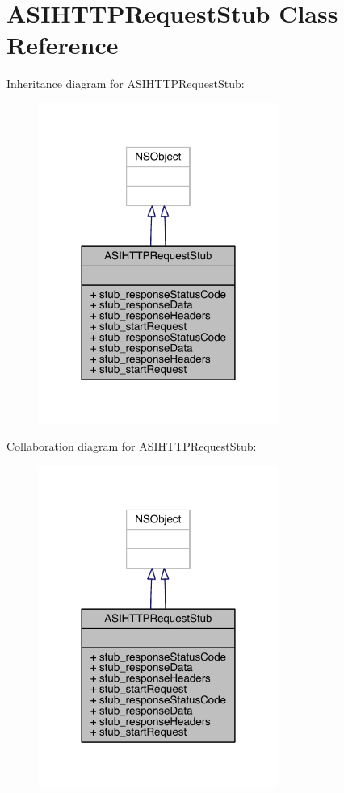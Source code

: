 \hypertarget{interface_a_s_i_h_t_t_p_request_stub}{\section{A\-S\-I\-H\-T\-T\-P\-Request\-Stub Class Reference}
\label{interface_a_s_i_h_t_t_p_request_stub}
}


Inheritance diagram for A\-S\-I\-H\-T\-T\-P\-Request\-Stub\-:\nopagebreak
\begin{figure}[H]
\begin{center}
\leavevmode
\includegraphics[width=222pt]{interface_a_s_i_h_t_t_p_request_stub__inherit__graph}
\end{center}
\end{figure}


Collaboration diagram for A\-S\-I\-H\-T\-T\-P\-Request\-Stub\-:\nopagebreak
\begin{figure}[H]
\begin{center}
\leavevmode
\includegraphics[width=222pt]{interface_a_s_i_h_t_t_p_request_stub__coll__graph}
\end{center}
\end{figure}
